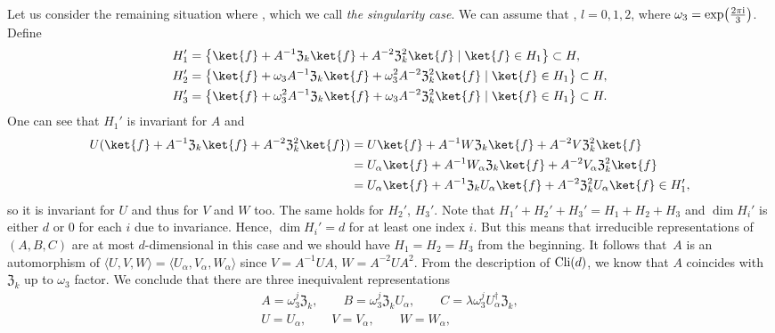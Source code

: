\documentclass[pdftex]{sigma}
\numberwithin{equation}{section}
\newcommand{\la}{\langle}
\newcommand{\ra}{\rangle}
\begin{document}
Let us consider the remaining situation
where ,
which we call \textit{the singularity case}.
We can assume that , $l=0,1,2$,
where $\omega_3 = \exp\bigl(\frac{2\pi{\rm i}}{3}\bigr)$. Define
\begin{align*}
& H_1' = \bigl\{\ket{f} + A^{-1}\mathfrak{Z}_k\ket{f} + A^{-2}\mathfrak{Z}_k^{2}\ket{f} \mid  \ket{f} \in H_1 \bigr\} \subset H, \\
 &H_2' = \bigl\{\ket{f} + \omega_3A^{-1}\mathfrak{Z}_k\ket{f} + \omega_3^2A^{-2}\mathfrak{Z}_k^{2}\ket{f} \mid  \ket{f} \in H_1 \bigr\} \subset H, \\
& H_3' = \bigl\{\ket{f} + \omega_3^2A^{-1}\mathfrak{Z}_k\ket{f} + \omega_3A^{-2}\mathfrak{Z}_k^{2}\ket{f} \mid  \ket{f} \in H_1 \bigr\} \subset H.
\end{align*}
One can see that $H_1'$ is invariant for $A$
and
\begin{align*}
 U(\ket{f} + A^{-1}\mathfrak{Z}_k\ket{f} + A^{-2}\mathfrak{Z}_k^{2}\ket{f})
 &= U \ket{f} + A^{-1}W\mathfrak{Z}_k\ket{f} + A^{-2}V\mathfrak{Z}_k^{2}\ket{f} \\
 &= U_\alpha \ket{f} + A^{-1}W_\alpha\mathfrak{Z}_k\ket{f} + A^{-2}V_\alpha\mathfrak{Z}_k^{2}\ket{f}\\
& = U_\alpha \ket{f} + A^{-1}\mathfrak{Z}_kU_\alpha\ket{f} + A^{-2}\mathfrak{Z}_k^{2}U_\alpha\ket{f}
 \in H_1',
\end{align*}
so it is invariant for $U$ and thus for $V$ and $W$ too. The same holds
for $H_2'$, $H_3'$. Note that $H_1'+H_2'+H_3' = H_1+H_2+H_3$ and $\dim H_i'$ is
either $d$ or $0$ for each $i$ due to invariance.
Hence, $\dim H_i' = d$ for at least one index $i$.
But this means that irreducible representations of $(A,B,C)$
are at most $d$-dimensional in this case and we should have $H_1=H_2=H_3$
from the beginning.
It follows that~$A$ is an automorphism of $\la U, V, W\ra = \la U_\alpha, V_\alpha, W_\alpha\ra$
since $V = A^{-1}UA$, $W = A^{-2}UA^2$.
From the description of ${\rm Cli}(d)$, we know that $A$ coincides with $\mathfrak{Z}_k$ up to $\omega_3$ factor.
We conclude that there are three inequivalent representations
\begin{gather}
 A = \omega_3^j \mathfrak{Z}_k,
 \qquad B = \omega_3^j \mathfrak{Z}_k U_\alpha,
\qquad C = \lambda \omega_3^j U_\alpha^\dag \mathfrak{Z}_k,\nonumber \\
 U = U_\alpha,
\qquad V = V_\alpha,
\qquad W = W_\alpha,\label{tri:aaasol}
\end{gather}
\end{document}

